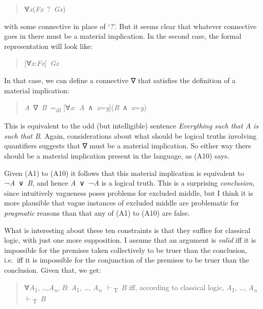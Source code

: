 \documentclass[
  10pt,
  letterpaper,
  DIV=11,
  numbers=noendperiod,
  twoside]{scrartcl}
\begin{document}
\begin{quote}
∀\emph{x}(\emph{Fx}~?~\emph{Gx})
\end{quote}

with some connective in place of `?'. But it seems clear that whatever
connective goes in there must be a material implication. In the second
case, the formal representation will look like:

\begin{quote}
{[}∀\emph{x}:\emph{Fx}{]}~\emph{Gx}
\end{quote}

In that case, we can define a connective ∇ that satisfies the definition
of a material implication:

\begin{quote}
\emph{A}~∇~\emph{B}~=\textsubscript{df}
{[}∀\emph{x}:~\emph{A}~∧~\emph{x}=\emph{y}{]}(\emph{B}~∧~\emph{x}=\emph{y})
\end{quote}

This is equivalent to the odd (but intelligible) sentence
\emph{Everything such that A is such that B}. Again, considerations
about what should be logical truths involving quantifiers suggests that
∇ must be a material implication. So either way there should be a
material implication present in the language, as (A10) says.

Given (A1) to (A10) it follows that this material implication is
equivalent to ¬\emph{A}~∨~\emph{B}, and hence \emph{A}~∨~¬\emph{A} is a
logical truth. This is a surprising \emph{conclusion}, since intuitively
vagueness poses problems for excluded middle, but I think it is more
plausible that vague instances of excluded middle are problematic for
\emph{pragmatic} reasons than that any of (A1) to (A10) are false.

What is interesting about these ten constraints is that they suffice for
classical logic, with just one more supposition. I assume that an
argument is \emph{valid} iff it is impossible for the premises taken
collectively to be truer than the conclusion, i.e.~iff it is impossible
for the conjunction of the premises to be truer than the conclusion.
Given that, we get:

\begin{quote}
∀\emph{A}\textsubscript{1}, \ldots,\emph{A\textsubscript{n}}, \emph{B}:
\emph{A}\textsubscript{1}, \ldots,
\emph{A\textsubscript{n}}~\(\vdash\)\textsubscript{T}~\emph{B} iff,
according to classical logic, \emph{A}\textsubscript{1}, \ldots,
\emph{A\textsubscript{n}}~\(\vdash\)\textsubscript{T}~\emph{B}
\end{quote}
\end{document}
